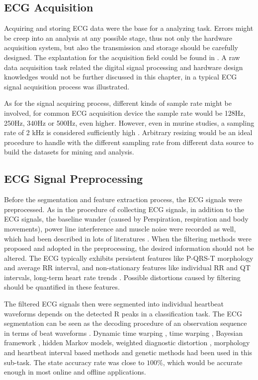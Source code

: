 \documentclass[graybox]{svmult}
\begin{document}
 

\subsection{ECG Acquisition}
Acquiring and storing ECG data were the base for a analyzing task. Errors might be creep into an analysis at any possible stage, thus not only the hardware acquisition system, but also the transmission and storage should be carefully designed. The explantation for the acquisition field could be found in \cite{clifford2006web}. A raw data acquisition task related the digital signal processing and hardware design knowledges would not be further discussed in this chapter, in \cite{silva2011dsp} a typical ECG signal acquisition process was illustrated. 

As for the signal acquiring process, different kinds of sample rate might be involved, for common ECG acquisition device the sample rate would be 128Hz, 250Hz, 340Hz or 500Hz, even higher. However, even in murine studies, a sampling rate of 2 kHz is considered sufficiently high \cite{ai1996studies}. Arbitrary resizing would be an ideal procedure to handle with the different sampling rate from different data source to build the datasets for mining and analysis.

\subsection{ECG Signal Preprocessing}
Before the segmentation and feature extraction process, the ECG signals were preprocessed. As in the procedure of collecting ECG signals,  in addition to the ECG signals, the baseline wander (caused by Perspiration, respiration and body movements), power line interference and muscle noise were recorded as well, which had been described in lots of literatures \cite{blanco2008ecg}.
When the filtering methods were proposed and adopted in the preprocessing, the desired information should not be altered. The ECG typically exhibits persistent features like P-QRS-T morphology and average RR interval,  and non-stationary features like individual RR and QT intervals, long-term heart rate trends \cite{clifford2006advanced}. Possible distortions caused by filtering should be quantified in these features.

The filtered ECG signals then were segmented into individual heartbeat waveforms depends on the detected R peaks in a classification task.  The ECG segmentation can be seen as the decoding procedure of an observation sequence in terms of beat waveforms \cite{andreao2006ecg}. Dynamic time warping \cite{vullings1998automated}, time warping \cite{vullings1997ecg}, Bayesian framework \cite{sayadi2009model}, hidden Markov models\cite{andreao2006ecg}, weighted diagnostic distortion \cite{zigel2000weighted}, morphology and heartbeat interval based methods \cite{de2004automatic} and genetic methods \cite{gacek2003genetic} had been used in this sub-task. The state accuracy rate was close to $100\%$, which would be accurate enough in most online and offline applications. 
\end{document}
